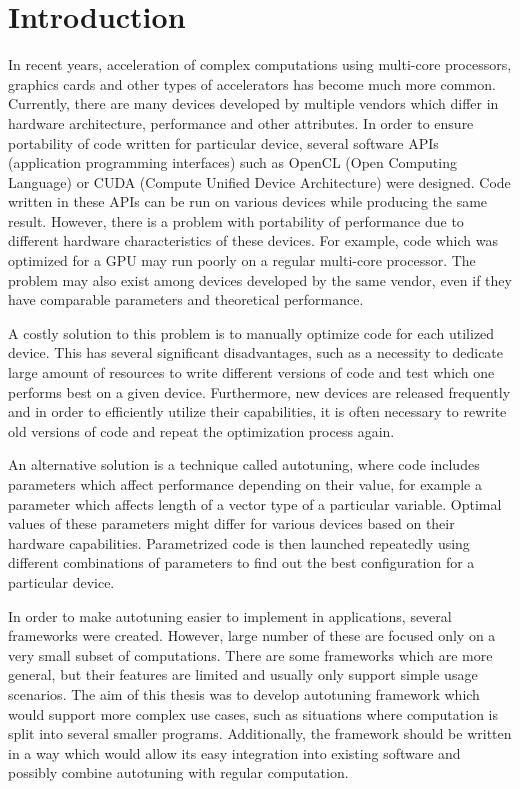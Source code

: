 \documentclass
[
    digital, %
    oneside, %
    table, %
    nolof, %
    nolot, %
    nocover %
]{fithesis3}
\begin{document}
\chapter{Introduction}
In recent years, acceleration of complex computations using multi-core processors, graphics cards and other types of accelerators has become
much more common. Currently, there are many devices developed by multiple vendors which differ in hardware architecture, performance and other
attributes. In order to ensure portability of code written for particular device, several software APIs (application programming interfaces) such as
OpenCL (Open Computing Language) or CUDA (Compute Unified Device Architecture) were designed. Code written in these APIs can be run on various
devices while producing the same result. However, there is a problem with portability of performance due to different hardware characteristics of
these devices. For example, code which was optimized for a GPU may run poorly on a regular multi-core processor. The problem may also exist among
devices developed by the same vendor, even if they have comparable parameters and theoretical performance.

A costly solution to this problem is to manually optimize code for each utilized device. This has several significant disadvantages, such as
a necessity to dedicate large amount of resources to write different versions of code and test which one performs best on a given device. Furthermore,
new devices are released frequently and in order to efficiently utilize their capabilities, it is often necessary to rewrite old versions of code and
repeat the optimization process again.

An alternative solution is a technique called autotuning, where code includes parameters which affect performance depending on their value, for
example a parameter which affects length of a vector type of a particular variable. Optimal values of these parameters might differ for various
devices based on their hardware capabilities. Parametrized code is then launched repeatedly using different combinations of parameters to find out the
best configuration for a particular device.

In order to make autotuning easier to implement in applications, several frameworks were created. However, large number of these are focused
only on a very small subset of computations. There are some frameworks which are more general, but their features are limited and usually only support
simple usage scenarios. The aim of this thesis was to develop autotuning framework which would support more complex use cases, such as situations
where computation is split into several smaller programs. Additionally, the framework should be written in a way which would allow its easy
integration into existing software and possibly combine autotuning with regular computation.
\end{document}
